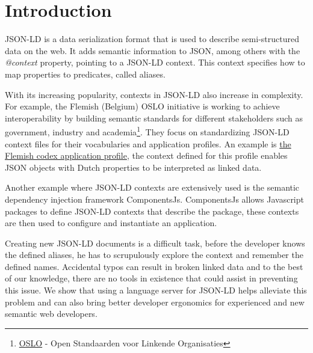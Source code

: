 \documentclass[
]{ceurart}
\begin{document}
\maketitle

\section{Introduction}

JSON-LD is a data serialization format that is used to describe semi-structured data on the web\cite{JSON-LD-W3C}.
It adds semantic information to JSON, among others with the \textit{@context} property, pointing to a JSON-LD context.
This context specifies how to map properties to predicates, called aliases.

With its increasing popularity, contexts in JSON-LD also increase in complexity.
For example, the Flemish (Belgium) OSLO initiative is working to achieve interoperability by building semantic standards for different stakeholders such as government, industry and academia\footnote{\href{https://www.vlaanderen.be/digitaal-vlaanderen/onze-oplossingen/oslo}{OSLO} - Open Standaarden voor Linkende Organisaties}.
They focus on standardizing JSON-LD context files for their vocabularies and application profiles. 
An example is \href{https://data.vlaanderen.be/doc/applicatieprofiel/vlaamse-codex/}{the Flemish codex application profile}, the context defined for this profile enables JSON objects with Dutch properties to be interpreted as linked data.

Another example where JSON-LD contexts are extensively used is the semantic dependency injection framework ComponentsJs\cite{CJS}. 
ComponentsJs allows Javascript packages to define JSON-LD contexts that describe the package, these contexts are then used to configure and instantiate an application.

Creating new JSON-LD documents is a difficult task, before the developer knows the defined aliases, he has to scrupulously explore the context and remember the defined names. 
Accidental typos can result in broken linked data and to the best of our knowledge, there are no tools in existence that could assist in preventing this issue.
We show that using a language server for JSON-LD helps alleviate this problem and can also bring better developer ergonomics for experienced and new semantic web developers.
\end{document}

